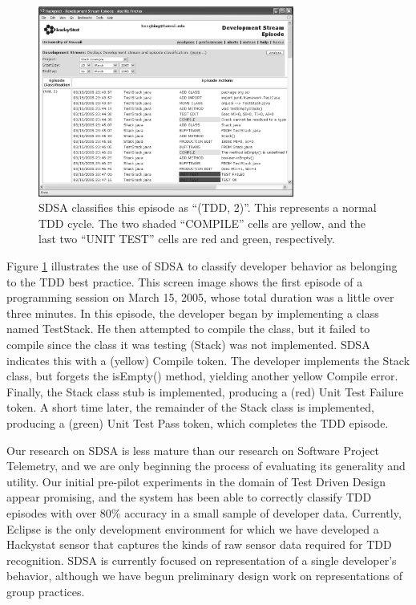 \begin{figure}[ht]
  \centering
  \includegraphics[width=0.75\textwidth]{sdsa.eps}
  \caption{SDSA classifies this episode as ``(TDD, 2)''. This represents a
normal TDD cycle.  The two shaded ``COMPILE'' cells are yellow, and the
last two ``UNIT TEST'' cells are red and green, respectively.}
  \label{fig:sdsa}
\end{figure}

Figure \ref{fig:sdsa} illustrates the use of SDSA to classify developer
behavior as belonging to the TDD best practice. This screen image shows the
first episode of a programming session on March 15, 2005, whose total
duration was a little over three minutes.  In this episode, the developer
began by implementing a class named TestStack. He then attempted to compile
the class, but it failed to compile since the class it was testing (Stack)
was not implemented.  SDSA indicates this with a (yellow) Compile token.
The developer implements the Stack class, but forgets the isEmpty() method,
yielding another yellow Compile error. Finally, the Stack class stub is
implemented, producing a (red) Unit Test Failure token.  A short time
later, the remainder of the Stack class is implemented, producing a (green)
Unit Test Pass token, which completes the TDD episode.

Our research on SDSA is less mature than our research on Software Project
Telemetry, and we are only beginning the process of evaluating its
generality and utility.  Our initial pre-pilot experiments in the domain of
Test Driven Design appear promising, and the system has been able to
correctly classify TDD episodes with over 80\% accuracy in a small sample
of developer data.   Currently, Eclipse is the only development
environment for which we have developed a Hackystat sensor that captures
the kinds of raw sensor data required for TDD recognition. SDSA is currently 
focused on representation of a single developer's behavior, although we have
begun preliminary design work on representations of group practices. 

